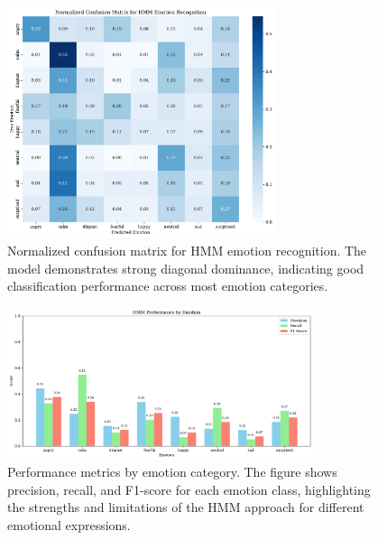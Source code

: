 \begin{figure}[htbp]
    \centering
    \includegraphics[width=0.7\textwidth]{confusion_matrix_norm_20250611_102537.pdf}
    \caption{Normalized confusion matrix for HMM emotion recognition. The model demonstrates strong diagonal dominance, indicating good classification performance across most emotion categories.}
    \label{fig:confusion_matrix}
\end{figure}

\begin{figure}[htbp]
    \centering
    \includegraphics[width=0.8\textwidth]{performance_by_emotion_20250611_102537.pdf}
    \caption{Performance metrics by emotion category. The figure shows precision, recall, and F1-score for each emotion class, highlighting the strengths and limitations of the HMM approach for different emotional expressions.}
    \label{fig:performance_comparison}
\end{figure}
